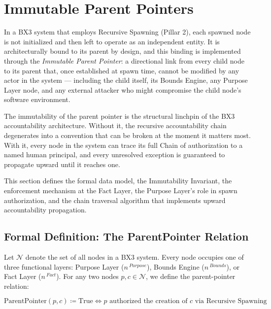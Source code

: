 \section{Immutable Parent Pointers}
\label{sec:immutable-parent-pointers}

In a BX3 system that employs Recursive Spawning (Pillar 2), each spawned node is not initialized and then left to operate as an independent entity. It is architecturally bound to its parent by design, and this binding is implemented through the \textit{Immutable Parent Pointer}: a directional link from every child node to its parent that, once established at spawn time, cannot be modified by any actor in the system --- including the child itself, its Bounds Engine, any Purpose Layer node, and any external attacker who might compromise the child node's software environment.

The immutability of the parent pointer is the structural linchpin of the BX3 accountability architecture. Without it, the recursive accountability chain degenerates into a convention that can be broken at the moment it matters most. With it, every node in the system can trace its full Chain of authorization to a named human principal, and every unresolved exception is guaranteed to propagate upward until it reaches one.

This section defines the formal data model, the Immutability Invariant, the enforcement mechanism at the Fact Layer, the Purpose Layer's role in spawn authorization, and the chain traversal algorithm that implements upward accountability propagation.

\subsection{Formal Definition: The ParentPointer Relation}
\label{sec:parent-pointer-relation}

Let $\mathcal{N}$ denote the set of all nodes in a BX3 system. Every node occupies one of three functional layers: Purpose Layer ($n^{\ Purpose}$), Bounds Engine ($n^{\ Bounds}$), or Fact Layer ($n^{\ Fact}$). For any two nodes $p, c \in \mathcal{N}$, we define the parent-pointer relation:

\begin{equation}
\text{ParentPointer}(p, c) \coloneqq \text{True}
\iff p \text{ authorized the creation of } c \text{ via Recursive Spawning}
\label{eq:parent-pointer-def}
\end{equation}

